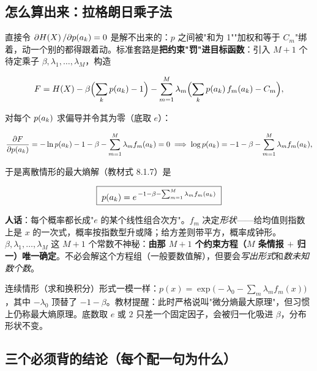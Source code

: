 \subsection{怎么算出来：拉格朗日乘子法}

直接令 $\partial H\!\left(X\right)/\partial p\!\left(a_k\right)=0$ 是解不出来的：$p$ 之间被"和为 1""加权和等于 $C_m$"绑着，动一个别的都得跟着动。标准套路是\textbf{把约束"罚"进目标函数}：引入 $M+1$ 个待定乘子 $\beta,\lambda_1,\dots,\lambda_M$，构造

\begin{align*}
F=H\!\left(X\right)-\beta\Bigl(\sum_{k}p\!\left(a_k\right)-1\Bigr)-\sum_{m=1}^{M}\lambda_m\Bigl(\sum_{k}p\!\left(a_k\right)f_m(a_k)-C_m\Bigr),
\end{align*}

对每个 $p\!\left(a_k\right)$ 求偏导并令其为零（底取 $e$）：

\begin{align*}
\frac{\partial F}{\partial p\!\left(a_k\right)}=-\ln p\!\left(a_k\right)-1-\beta-\sum_{m=1}^{M}\lambda_m f_m(a_k)=0
\;\Longrightarrow\;
\log p\!\left(a_k\right)=-1-\beta-\sum_{m=1}^{M}\lambda_m f_m(a_k),
\end{align*}

于是离散情形的最大熵解（教材式 8.1.7）是

\begin{align*}
\boxed{\;p\!\left(a_k\right)=e^{\,-1-\beta-\sum_{m=1}^{M}\lambda_m f_m(a_k)}\;}
\end{align*}

\textbf{人话}：每个概率都长成"$e$ 的某个线性组合次方"。$f_m$ 决定\emph{形状}——给均值则指数上是 $x$ 的一次式，概率按指数型升或降；给方差则带平方，概率成钟形。$\beta,\lambda_1,\dots,\lambda_M$ 这 $M+1$ 个常数不神秘：\textbf{由那 $M+1$ 个约束方程（$M$ 条情报 $+$ 归一）唯一确定}。不必会解这个方程组（一般要数值解），但要会\emph{写出形式}和\emph{数未知数个数}。

连续情形（求和换积分）形式一模一样：$p(x)=\exp\bigl(-\lambda_0-\sum_m\lambda_m f_m(x)\bigr)$，其中 $-\lambda_0$ 顶替了 $-1-\beta$。教材提醒：此时严格说叫"微分熵最大原理"，但习惯上仍称最大熵原理。底数取 $e$ 或 $2$ 只差一个固定因子，会被归一化吸进 $\beta$，分布形状不变。

\subsection{三个必须背的结论（每个配一句为什么）}

